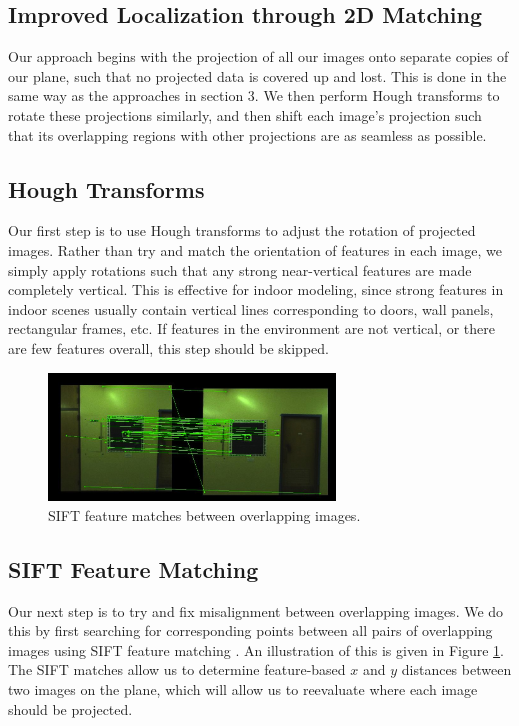 \documentclass[10pt,twocolumn,letterpaper]{article}
\begin{document}
\subsection{Improved Localization through 2D Matching}
Our approach begins with the projection of all our images onto
separate copies of our plane, such that no projected data is covered
up and lost. This is done in the same way as the approaches in section
3. We then perform Hough transforms to rotate these projections
similarly, and then shift each image's projection such that its
overlapping regions with other projections are as seamless as
possible.

\subsection{Hough Transforms}
Our first step is to use Hough transforms to adjust the rotation of
projected images. Rather than try and match the orientation of
features in each image, we simply apply rotations such that any strong
near-vertical features are made completely vertical. This is effective
for indoor modeling, since strong features in indoor scenes usually
contain vertical lines corresponding to doors, wall panels,
rectangular frames, etc. If features in the environment are not
vertical, or there are few features overall, this step should be
skipped.


\begin{figure}
  \centering
  \includegraphics[width=3in]{matches.jpg}
  \caption{SIFT feature matches between overlapping images.}
  \label{fig:matches}
\end{figure}


\subsection{SIFT Feature Matching}
Our next step is to try and fix misalignment between overlapping
images. We do this by first searching for corresponding points between
all pairs of overlapping images using SIFT feature matching
\cite{lowe1999object}. An illustration of this is given in Figure
\ref{fig:matches}. The SIFT matches allow us to determine
feature-based $x$ and $y$ distances between two images on the plane,
which will allow us to reevaluate where each image should be
projected.
\end{document}
